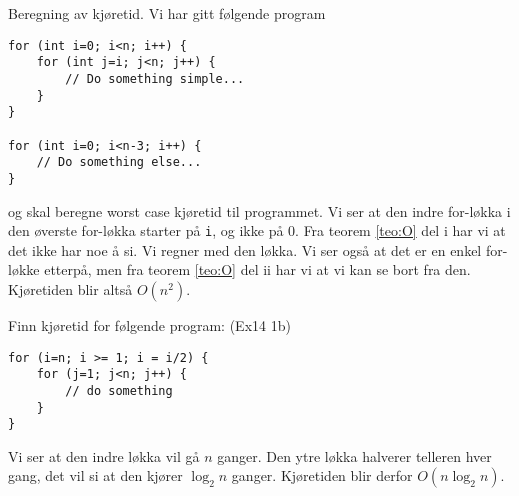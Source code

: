 \begin{eks} Beregning av kjøretid. Vi har gitt følgende program
\begin{verbatim}
for (int i=0; i<n; i++) {
    for (int j=i; j<n; j++) {
        // Do something simple...
    }
}

for (int i=0; i<n-3; i++) {
    // Do something else...
}
\end{verbatim}
og skal beregne worst case kjøretid til programmet. Vi ser at den indre for-løkka i den øverste for-løkka starter på \verb|i|, og ikke på 0. Fra teorem \ref{teo:O} del i har vi at det ikke har noe å si. Vi regner med den løkka. Vi ser også at det er en enkel for-løkke etterpå, men fra teorem \ref{teo:O} del ii har vi at vi kan se bort fra den. Kjøretiden blir altså $ O(n^2) $.
\end{eks}


\begin{eks} Finn kjøretid for følgende program: (Ex14 1b)

\begin{verbatim}
for (i=n; i >= 1; i = i/2) {
    for (j=1; j<n; j++) {
        // do something
    }
}
\end{verbatim}
Vi ser at den indre løkka vil gå $ n $ ganger. Den ytre løkka halverer telleren hver gang, det vil si at den kjører $ \log_2 n $ ganger. Kjøretiden blir derfor $ O(n\log_2 n) $.
\end{eks}


